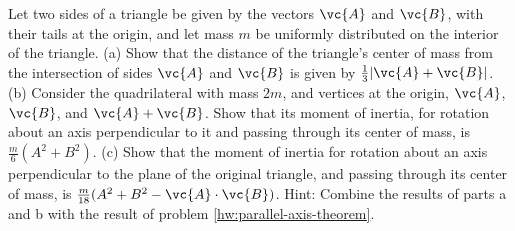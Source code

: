 Let two sides of a triangle be given by the vectors $\vc{A}$ and $\vc{B}$, with their tails
at the origin, and
let mass $m$ be uniformly distributed
on the interior of the triangle.
(a) Show that the distance of the triangle's center of mass from the intersection
of sides $\vc{A}$ and $\vc{B}$ is given by $\frac{1}{3}|\vc{A}+\vc{B}|$.\hwendpart
(b) Consider the quadrilateral with mass $2m$, and vertices at the origin, $\vc{A}$, $\vc{B}$, and $\vc{A}+\vc{B}$.
Show that its moment of inertia, for rotation about an axis perpendicular to it and passing through its center of mass,
is $\frac{m}{6}(A^2+B^2)$.\hwendpart
(c) Show that the moment of inertia for rotation about an axis perpendicular to
the plane of the original triangle, and passing through its center of mass, is $\frac{m}{18}(A^2+B^2-\vc{A}\cdot\vc{B})$.
Hint: Combine the results of parts a and b with the result of problem \ref{hw:parallel-axis-theorem}.
